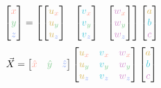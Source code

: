 \documentclass[preview]{standalone}
\begin{document}
$$\begin{bmatrix}\textcolor[HTML]{fea294}{x}\\\textcolor[HTML]{81cb8f}{y}\\\textcolor[HTML]{91abf6}{z}\end{bmatrix} = \begin{bmatrix}
\begin{bmatrix}\textcolor[HTML]{d7b760}{u}_{\textcolor[HTML]{fea294}{x}}\\\textcolor[HTML]{d7b760}{u}_{\textcolor[HTML]{81cb8f}{y}}\\\textcolor[HTML]{d7b760}{u}_{\textcolor[HTML]{91abf6}{z}}\end{bmatrix} &
\begin{bmatrix}\textcolor[HTML]{46c6d9}{v}_{\textcolor[HTML]{fea294}{x}}\\\textcolor[HTML]{46c6d9}{v}_{\textcolor[HTML]{81cb8f}{y}}\\\textcolor[HTML]{46c6d9}{v}_{\textcolor[HTML]{91abf6}{z}}\end{bmatrix} &
\begin{bmatrix}\textcolor[HTML]{d290cd}{w}_{\textcolor[HTML]{fea294}{x}}\\\textcolor[HTML]{d290cd}{w}_{\textcolor[HTML]{81cb8f}{y}}\\\textcolor[HTML]{d290cd}{w}_{\textcolor[HTML]{91abf6}{z}}\end{bmatrix}
\end{bmatrix}\begin{bmatrix}\textcolor[HTML]{d7b760}{a}\\\textcolor[HTML]{46c6d9}{b}\\\textcolor[HTML]{d290cd}{c}\end{bmatrix}$$
$$\vec{X} = \begin{bmatrix}\textcolor[HTML]{fea294}{\hat{x}}&\textcolor[HTML]{81cb8f}{\hat{y}}&\textcolor[HTML]{91abf6}{\hat{z}}\end{bmatrix}\begin{bmatrix}
\textcolor[HTML]{d7b760}{u}_{\textcolor[HTML]{fea294}{x}}&\textcolor[HTML]{46c6d9}{v}_{\textcolor[HTML]{fea294}{x}}&\textcolor[HTML]{d290cd}{w}_{\textcolor[HTML]{fea294}{x}}\\
\textcolor[HTML]{d7b760}{u}_{\textcolor[HTML]{81cb8f}{y}}&\textcolor[HTML]{46c6d9}{v}_{\textcolor[HTML]{81cb8f}{y}}&\textcolor[HTML]{d290cd}{w}_{\textcolor[HTML]{81cb8f}{y}}\\
\textcolor[HTML]{d7b760}{u}_{\textcolor[HTML]{91abf6}{z}}&\textcolor[HTML]{46c6d9}{v}_{\textcolor[HTML]{91abf6}{z}}&\textcolor[HTML]{d290cd}{w}_{\textcolor[HTML]{91abf6}{z}}
\end{bmatrix}\begin{bmatrix}\textcolor[HTML]{d7b760}{a}\\\textcolor[HTML]{46c6d9}{b}\\\textcolor[HTML]{d290cd}{c}\end{bmatrix}$$
\end{document}
